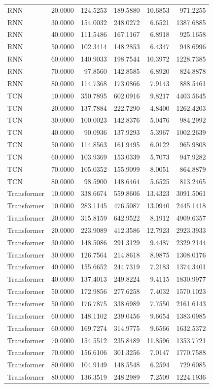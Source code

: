 \begin{tabular}{lrrrrr}
RNN & 20.0000 & 124.5253 & 189.5880 & 10.6853 & 971.2255 \\
RNN & 30.0000 & 154.0032 & 248.0272 & 6.6521 & 1387.6885 \\
RNN & 40.0000 & 111.5486 & 167.1167 & 6.8918 & 925.1658 \\
RNN & 50.0000 & 102.3414 & 148.2853 & 6.4347 & 948.6996 \\
RNN & 60.0000 & 140.9033 & 198.7544 & 10.3972 & 1228.7385 \\
RNN & 70.0000 & 97.8560 & 142.8585 & 6.8920 & 824.8878 \\
RNN & 80.0000 & 114.7368 & 173.0866 & 7.9143 & 888.5461 \\
TCN & 10.0000 & 350.7895 & 602.0916 & 9.8217 & 4403.5645 \\
TCN & 20.0000 & 137.7884 & 222.7290 & 4.8400 & 1262.4203 \\
TCN & 30.0000 & 100.0023 & 142.8376 & 5.0476 & 984.2992 \\
TCN & 40.0000 & 90.0936 & 137.9293 & 5.3967 & 1002.2639 \\
TCN & 50.0000 & 114.8563 & 161.9495 & 6.0122 & 965.9808 \\
TCN & 60.0000 & 103.9369 & 153.0339 & 5.7073 & 947.9282 \\
TCN & 70.0000 & 105.0352 & 155.9099 & 8.0051 & 864.8879 \\
TCN & 80.0000 & 98.5900 & 148.6464 & 5.6525 & 813.2465 \\
Transformer & 10.0000 & 338.6674 & 559.8606 & 13.4323 & 3091.5061 \\
Transformer & 10.0000 & 283.1145 & 476.5087 & 13.0940 & 2445.1418 \\
Transformer & 20.0000 & 315.8159 & 642.9522 & 8.1912 & 4909.6357 \\
Transformer & 20.0000 & 223.9089 & 412.3586 & 12.7923 & 2923.3933 \\
Transformer & 30.0000 & 148.5086 & 291.3129 & 9.4487 & 2329.2144 \\
Transformer & 30.0000 & 126.7564 & 214.8618 & 8.9875 & 1308.0176 \\
Transformer & 40.0000 & 155.6652 & 244.7319 & 7.2183 & 1374.3401 \\
Transformer & 40.0000 & 137.4013 & 249.8224 & 9.4115 & 1830.9977 \\
Transformer & 50.0000 & 172.9856 & 277.6258 & 7.4032 & 1570.1023 \\
Transformer & 50.0000 & 176.7875 & 338.6989 & 7.7550 & 2161.6143 \\
Transformer & 60.0000 & 148.1102 & 239.0456 & 9.6654 & 1383.0985 \\
Transformer & 60.0000 & 169.7274 & 314.9775 & 9.6566 & 1632.5372 \\
Transformer & 70.0000 & 154.5512 & 235.8489 & 11.8596 & 1353.7721 \\
Transformer & 70.0000 & 156.6106 & 301.3256 & 7.0147 & 1770.7588 \\
Transformer & 80.0000 & 104.9149 & 148.5548 & 6.2594 & 729.6085 \\
Transformer & 80.0000 & 136.3519 & 248.2989 & 7.2509 & 1224.1936 \\
\bottomrule
\end{tabular}
